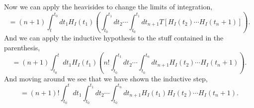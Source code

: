 \documentclass[working, oneside]{../../Preambles/tuftebook}
\begin{document}
Now we can apply the heavisides to change the limits of integration,
\[
= \left( n+1 \right) \int_{t}^{t_0} dt_1H_{I}\left( t_1 \right) \left(    \int^{t_1}_{t_0} dt_2   \cdots \int^{t_1}_{t_0} dt_{n+1} T\left[ H_I\left( t_2 \right) \cdots H_I\left( t_n+1 \right)  \right]  \right)
.\] 
And we can apply the inductive hypothesis to the stuff contained in the parenthesis,
\[
= \left( n+1 \right) \int^{t}_{t_0} dt_1H_{I}\left( t_1 \right) \left(  n!  \int^{t_1}_{t_0} dt_2   \cdots \int^{t_n}_{t_0} dt_{n+1} H_I\left( t_2 \right) \cdots H_I\left( t_n+1 \right)   \right)
.\] 
And moving around we see that we have shown the inductive step,
\[
= \left( n+1 \right)! \int^{t}_{t_0} dt_1  \int^{t_1}_{t_0} dt_2   \cdots \int^{t_n}_{t_0} dt_{n+1} H_{I}\left( t_1 \right)H_I\left( t_2 \right) \cdots H_I\left( t_n+1 \right)
.\] 
\end{document}
